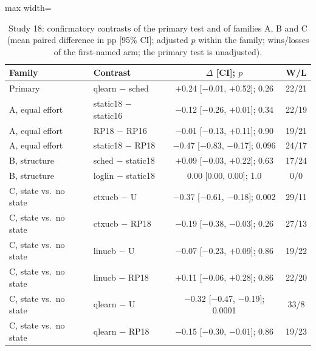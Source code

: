 \begin{table}[t]
\caption{Study 18: confirmatory contrasts of the primary test and of families A, B and C (mean paired difference in pp [95\% CI]; adjusted $p$ within the family; wins/losses of the first-named arm; the primary test is unadjusted).}\label{tab:s18f}
\centering
\small
\begin{adjustbox}{max width=\linewidth}
\begin{tabular}{llcc}
\toprule
Family & Contrast & $\Delta$ [CI]; $p$ & W/L \\
\midrule
Primary & qlearn $-$ sched & $+$0.24 [$-$0.01, $+$0.52]; 0.26 & 22/21 \\
A, equal effort & static18 $-$ static16 & $-$0.12 [$-$0.26, $+$0.01]; 0.34 & 22/19 \\
A, equal effort & RP18 $-$ RP16 & $-$0.01 [$-$0.13, $+$0.11]; 0.90 & 19/21 \\
A, equal effort & static18 $-$ RP18 & $-$0.47 [$-$0.83, $-$0.17]; 0.096 & 24/17 \\
B, structure & sched $-$ static18 & $+$0.09 [$-$0.03, $+$0.22]; 0.63 & 17/24 \\
B, structure & loglin $-$ static18 & 0.00 [0.00, 0.00]; 1.0 & 0/0 \\
C, state vs.\ no state & ctxucb $-$ U & $-$0.37 [$-$0.61, $-$0.18]; 0.002 & 29/11 \\
C, state vs.\ no state & ctxucb $-$ RP18 & $-$0.19 [$-$0.38, $-$0.03]; 0.26 & 27/13 \\
C, state vs.\ no state & linucb $-$ U & $-$0.07 [$-$0.23, $+$0.09]; 0.86 & 19/22 \\
C, state vs.\ no state & linucb $-$ RP18 & $+$0.11 [$-$0.06, $+$0.28]; 0.86 & 22/20 \\
C, state vs.\ no state & qlearn $-$ U & $-$0.32 [$-$0.47, $-$0.19]; 0.0001 & 33/8 \\
C, state vs.\ no state & qlearn $-$ RP18 & $-$0.15 [$-$0.30, $-$0.01]; 0.86 & 19/23 \\
\bottomrule
\end{tabular}
\end{adjustbox}
\end{table}
